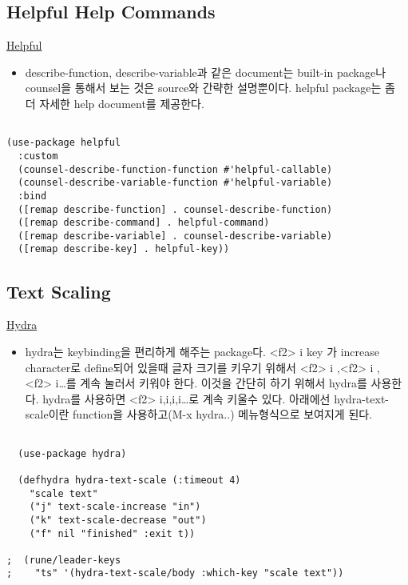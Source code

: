 \documentclass[11pt]{article}
\begin{document}
\subsection*{Helpful Help Commands}
\label{sec:org09af419}

\href{https://github.com/Wilfred/helpful}{Helpful} 
\begin{itemize}
\item describe-function, describe-variable과 같은 document는 built-in package나 counsel을 통해서 보는 것은 source와 간략한 설명뿐이다. helpful package는 좀 더 자세한 help document를 제공한다.
\end{itemize}

\begin{verbatim}

(use-package helpful
  :custom
  (counsel-describe-function-function #'helpful-callable)
  (counsel-describe-variable-function #'helpful-variable)
  :bind
  ([remap describe-function] . counsel-describe-function)
  ([remap describe-command] . helpful-command)
  ([remap describe-variable] . counsel-describe-variable)
  ([remap describe-key] . helpful-key))

\end{verbatim}

\subsection*{Text Scaling}
\label{sec:org5a16698}

\href{https://github.com/abo-abo/hydra}{Hydra} 
\begin{itemize}
\item hydra는 keybinding을 편리하게 해주는 package다. <f2> i key 가 increase character로 define되어 있을때 글자 크기를 키우기 위해서 <f2> i ,<f2> i , <f2> i\ldots{}를 계속 눌러서 키워야 한다. 이것을 간단히 하기 위해서 hydra를 사용한다.  hydra를 사용하면 <f2> i,i,i,i\ldots{}로 계속 키울수 있다. 아래에선 hydra-text-scale이란 function을 사용하고(M-x hydra..) 메뉴형식으로 보여지게 된다.
\end{itemize}
\begin{verbatim}

  (use-package hydra)

  (defhydra hydra-text-scale (:timeout 4)
    "scale text"
    ("j" text-scale-increase "in")
    ("k" text-scale-decrease "out")
    ("f" nil "finished" :exit t))

;  (rune/leader-keys
;    "ts" '(hydra-text-scale/body :which-key "scale text"))

\end{verbatim}
\end{document}
